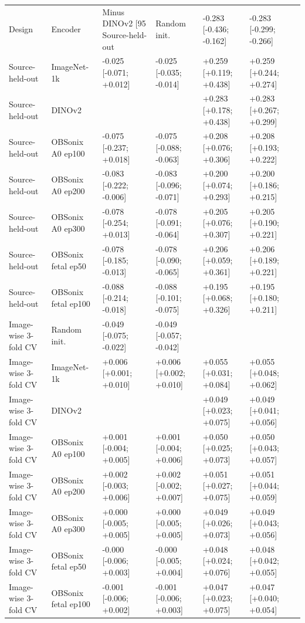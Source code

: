 \begin{tabular}{llllll}
\toprule
Design & Encoder & Minus DINOv2 [95%
\midrule
Source-held-out & Random init. & -0.283 [-0.436; -0.162] & -0.283 [-0.299; -0.266] &  &  \\
Source-held-out & ImageNet-1k & -0.025 [-0.071; +0.012] & -0.025 [-0.035; -0.014] & +0.259 [+0.119; +0.438] & +0.259 [+0.244; +0.274] \\
Source-held-out & DINOv2 &  &  & +0.283 [+0.178; +0.438] & +0.283 [+0.267; +0.299] \\
Source-held-out & OBSonix A0 ep100 & -0.075 [-0.237; +0.018] & -0.075 [-0.088; -0.063] & +0.208 [+0.076; +0.306] & +0.208 [+0.193; +0.222] \\
Source-held-out & OBSonix A0 ep200 & -0.083 [-0.222; -0.006] & -0.083 [-0.096; -0.071] & +0.200 [+0.074; +0.293] & +0.200 [+0.186; +0.215] \\
Source-held-out & OBSonix A0 ep300 & -0.078 [-0.254; +0.013] & -0.078 [-0.091; -0.064] & +0.205 [+0.076; +0.307] & +0.205 [+0.190; +0.221] \\
Source-held-out & OBSonix fetal ep50 & -0.078 [-0.185; -0.013] & -0.078 [-0.090; -0.065] & +0.206 [+0.059; +0.361] & +0.206 [+0.189; +0.221] \\
Source-held-out & OBSonix fetal ep100 & -0.088 [-0.214; -0.018] & -0.088 [-0.101; -0.075] & +0.195 [+0.068; +0.326] & +0.195 [+0.180; +0.211] \\
Image-wise 3-fold CV & Random init. & -0.049 [-0.075; -0.022] & -0.049 [-0.057; -0.042] &  &  \\
Image-wise 3-fold CV & ImageNet-1k & +0.006 [+0.001; +0.010] & +0.006 [+0.002; +0.010] & +0.055 [+0.031; +0.084] & +0.055 [+0.048; +0.062] \\
Image-wise 3-fold CV & DINOv2 &  &  & +0.049 [+0.023; +0.075] & +0.049 [+0.041; +0.056] \\
Image-wise 3-fold CV & OBSonix A0 ep100 & +0.001 [-0.004; +0.005] & +0.001 [-0.004; +0.006] & +0.050 [+0.025; +0.073] & +0.050 [+0.043; +0.057] \\
Image-wise 3-fold CV & OBSonix A0 ep200 & +0.002 [-0.003; +0.006] & +0.002 [-0.002; +0.007] & +0.051 [+0.027; +0.075] & +0.051 [+0.044; +0.059] \\
Image-wise 3-fold CV & OBSonix A0 ep300 & +0.000 [-0.005; +0.005] & +0.000 [-0.005; +0.005] & +0.049 [+0.026; +0.073] & +0.049 [+0.043; +0.056] \\
Image-wise 3-fold CV & OBSonix fetal ep50 & -0.000 [-0.006; +0.003] & -0.000 [-0.005; +0.004] & +0.048 [+0.024; +0.076] & +0.048 [+0.042; +0.055] \\
Image-wise 3-fold CV & OBSonix fetal ep100 & -0.001 [-0.006; +0.002] & -0.001 [-0.006; +0.003] & +0.047 [+0.023; +0.075] & +0.047 [+0.040; +0.054] \\
\bottomrule
\end{tabular}
